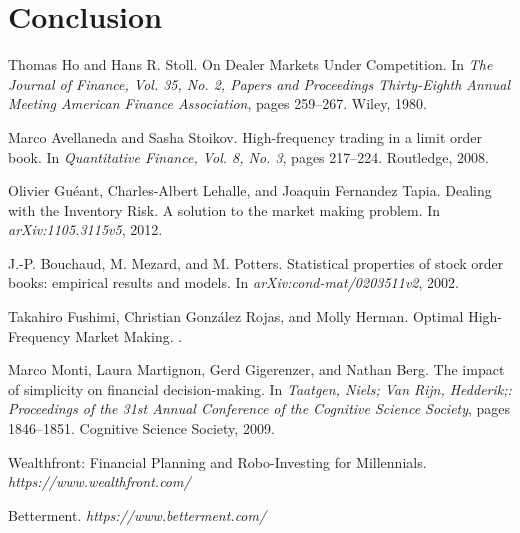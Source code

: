 \documentclass{article}
\begin{document}
\section{Conclusion}
\label{sec:conclusion}

  

\begin{thebibliography}{1}

Thomas Ho and Hans R. Stoll.
\newblock On Dealer Markets Under Competition.
\newblock In {\em The Journal of Finance, Vol. 35, No. 2, Papers and Proceedings Thirty-Eighth Annual Meeting American Finance Association}, pages 259--267. Wiley, 1980.

Marco Avellaneda and Sasha Stoikov.
\newblock High-frequency trading in a limit order book.
\newblock In {\em Quantitative Finance, Vol. 8, No. 3}, pages 217--224. Routledge, 2008.

Olivier Guéant, Charles-Albert Lehalle, and Joaquin Fernandez Tapia.
\newblock Dealing with the Inventory Risk. A solution to the market making problem.
\newblock In {\em 	arXiv:1105.3115v5}, 2012.

J.-P. Bouchaud, M. Mezard, and M. Potters.
\newblock Statistical properties of stock order books: empirical results and models.
\newblock In {\em arXiv:cond-mat/0203511v2}, 2002.

Takahiro Fushimi, Christian González Rojas, and Molly Herman.
\newblock Optimal High-Frequency Market Making.
.

Marco Monti, Laura Martignon, Gerd Gigerenzer, and Nathan Berg.
\newblock The impact of simplicity on financial decision-making.
\newblock In {\em Taatgen, Niels; Van Rijn, Hedderik;: Proceedings of the 31st Annual Conference of the Cognitive Science Society}, pages 1846--1851. Cognitive Science Society, 2009.

Wealthfront: Financial Planning and Robo-Investing for Millennials.
\newblock \emph{https://www.wealthfront.com/}

Betterment.
\newblock \emph{https://www.betterment.com/}

\end{thebibliography}
\end{document}
